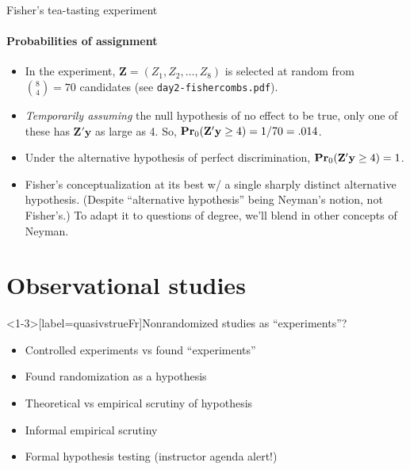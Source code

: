 \begin{frame}{Fisher's tea-tasting experiment}
  \framesubtitle{Probabilities of assignment}
  \begin{itemize}
  \item In the experiment, $\mathbf{Z} = (Z_{1}, Z_{2}, \ldots,
    Z_{8})$ is selected at random from ${8 \choose 4} = 70$ candidates
    (see \texttt{day2-fishercombs.pdf}).
  \item \textit{Temporarily assuming} the null hypothesis of no effect to
    be true, only one of these has $\mathbf{Z}'\mathbf{y}$ as large as
    4. So, $\mathbf{Pr}_{0}(\mathbf{Z}'\mathbf{y} \geq 4) = 1/70 = .014$.
  \item Under the alternative hypothesis of perfect discrimination,  $\mathbf{Pr}_{0}(\mathbf{Z}'\mathbf{y} \geq 4) = 1$.
  \item Fisher's conceptualization at its best w/ a single sharply
    distinct alternative hypothesis. (Despite ``alternative hypothesis'' being Neyman's notion, not
    Fisher's.)  To adapt it to questions of degree, we'll blend in
    other concepts of Neyman.  
  \end{itemize}
\end{frame}

\section{Observational studies}


\begin{frame}<1-3>[label=quasivstrueFr]{Nonrandomized studies as
    ``experiments''?}
  \begin{itemize}[<+->]
  \item Controlled experiments vs found ``experiments''
  \item Found randomization as a hypothesis
  \item Theoretical vs empirical scrutiny of hypothesis
  \item Informal empirical scrutiny
  \item Formal hypothesis testing (instructor agenda alert!)
  \end{itemize}
\end{frame}



